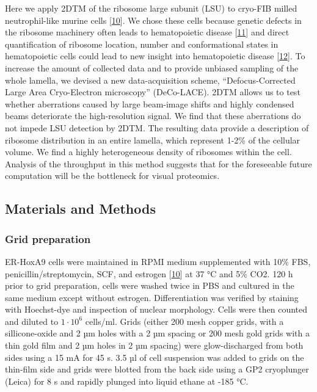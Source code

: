\documentclass[
]{article}
\begin{document}
Here we apply 2DTM of the ribosome large subunit (LSU) to cryo-FIB milled
neutrophil-like murine cells {[}\protect\hyperlink{ref-1B9Vt9eYu}{10}{]}. We chose these
cells because genetic defects in the ribosome machinery often leads to
hematopoietic disease {[}\protect\hyperlink{ref-gRoY21jY}{11}{]} and direct quantification of
ribosome location, number and conformational states in hematopoietic cells could
lead to new insight into hematopoietic disease {[}\protect\hyperlink{ref-KAJ7221k}{12}{]}.
To increase the amount of collected data and to provide unbiased sampling of the
whole lamella, we devised a new data-acquisition scheme, ``Defocus-Corrected
Large Area Cryo-Electron microscopy'' (DeCo-LACE). 2DTM allows us to test whether
aberrations caused by large beam-image shifts and highly condensed beams
deteriorate the high-resolution signal. We find that these aberrations do not
impede LSU detection by 2DTM. The resulting data provide a description of
ribosome distribution in an entire lamella, which represent 1-2\% of the cellular
volume. We find a highly heterogeneous density of ribosomes within the cell.
Analysis of the throughput in this method suggests that for the foreseeable
future computation will be the bottleneck for visual proteomics.

\hypertarget{materials-and-methods}{%
\subsection{Materials and Methods}\label{materials-and-methods}}

\hypertarget{grid-preparation}{%
\subsubsection{Grid preparation}\label{grid-preparation}}

ER-HoxA9 cells were maintained in RPMI medium supplemented with 10\% FBS,
penicillin/streptomycin, SCF, and estrogen {[}\protect\hyperlink{ref-1B9Vt9eYu}{10}{]} at
37 °C and 5\% CO2. 120 h prior to grid preparation, cells were washed twice in PBS
and cultured in the same medium except without estrogen. Differentiation was
verified by staining with Hoechst-dye and inspection of nuclear morphology.
Cells were then counted and diluted to \(1\cdot10^6\) cells/ml. Grids (either 200
mesh copper grids, with a sillicone-oxide and 2 µm holes with a 2 µm spacing or
200 mesh gold grids with a thin gold film and 2 µm holes in 2 µm spacing) were
glow-discharged from both sides using a 15 mA for 45 s. 3.5 µl of cell suspension
was added to grids on the thin-film side and grids were blotted from the back
side using a GP2 cryoplunger (Leica) for 8 s and rapidly plunged into liquid
ethane at -185 °C.
\end{document}

